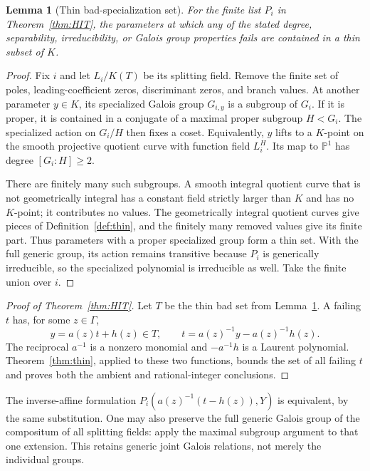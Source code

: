 \documentclass[11pt,a4paper]{article}
\newtheorem{lemma}[theorem]{Lemma}
\theoremstyle{definition}
\theoremstyle{remark}
\newcommand{\Pone}{\mathbb P^1}
\begin{document}
\begin{lemma}[Thin bad-specialization set]\label{lem:hilbertbad}
For the finite list $P_i$ in Theorem~\ref{thm:HIT}, the parameters at
which any of the stated degree, separability, irreducibility, or Galois
group properties fails are contained in a thin subset of $K$.
\end{lemma}
\begin{proof}
Fix $i$ and let $L_i/K(T)$ be its splitting field. Remove the finite set
of poles, leading-coefficient zeros, discriminant zeros, and branch
values. At another parameter $y\in K$, its specialized Galois group
$G_{i,y}$ is a subgroup of $G_i$. If it is proper, it is contained in a
conjugate of a maximal proper subgroup $H<G_i$. The specialized action
on $G_i/H$ then fixes a coset. Equivalently, $y$ lifts to a $K$-point on
the smooth projective quotient curve with function field $L_i^H$.
Its map to $\Pone$ has degree $[G_i:H]\ge2$.

There are finitely many such subgroups. A smooth integral quotient curve
that is not geometrically integral has a constant field strictly larger
than $K$ and has no $K$-point; it contributes no values. The geometrically
integral quotient curves give pieces of Definition~\ref{def:thin}, and
the finitely many removed values give its finite part. Thus parameters
with a proper specialized group form a thin set. With the full generic
group, its action remains transitive because $P_i$ is generically
irreducible, so the specialized polynomial is irreducible as well.
Take the finite union over $i$.
\end{proof}

\begin{proof}[Proof of Theorem~\ref{thm:HIT}]
Let $T$ be the thin bad set from Lemma~\ref{lem:hilbertbad}. A failing
$t$ has, for some $z\in\Gamma$,
\[
 y=a(z)t+h(z)\in T,
 \qquad t=a(z)^{-1}y-a(z)^{-1}h(z).
\]
The reciprocal $a^{-1}$ is a nonzero monomial and $-a^{-1}h$ is a
Laurent polynomial. Theorem~\ref{thm:thin}, applied to these two
functions, bounds the set of all failing $t$ and proves both the
ambient and rational-integer conclusions.
\end{proof}

The inverse-affine formulation $P_i(a(z)^{-1}(t-h(z)),Y)$ is equivalent,
by the same substitution. One may also preserve the full generic Galois
group of the compositum of all splitting fields: apply the maximal
subgroup argument to that one extension. This retains generic joint
Galois relations, not merely the individual groups.
\end{document}

